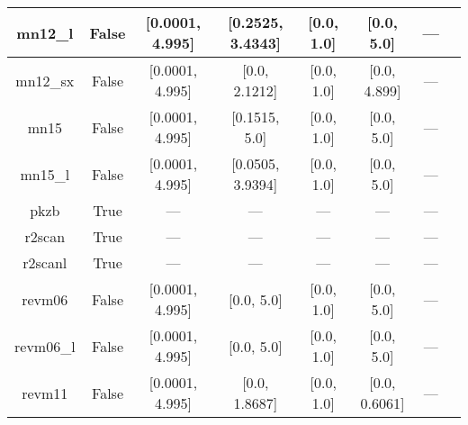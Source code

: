 \begin{tabular}{|c|c|c|c|c|c|c|l|}
      mn12\_l &                 False &  [0.0001, 4.995] & [0.2525, 3.4343] &       [0.0, 1.0] &     [0.0, 5.0] &        --- &                                                          \cite{Peverati2012_13171} \\ \hline
     mn12\_sx &                 False &  [0.0001, 4.995] &    [0.0, 2.1212] &       [0.0, 1.0] &   [0.0, 4.899] &        --- &                                                          \cite{Peverati2012_16187} \\ \hline
         mn15 &                 False &  [0.0001, 4.995] &    [0.1515, 5.0] &       [0.0, 1.0] &     [0.0, 5.0] &        --- &                                                                 \cite{Yu2016_5032} \\ \hline
      mn15\_l &                 False &  [0.0001, 4.995] & [0.0505, 3.9394] &       [0.0, 1.0] &     [0.0, 5.0] &        --- &                                                                 \cite{Yu2016_1280} \\ \hline
         pkzb &                  True &              --- &              --- &              --- &            --- &        --- &                                                             \cite{Perdew1999_2544} \\ \hline
       r2scan &                  True &              --- &              --- &              --- &            --- &        --- &                                           \cite{Furness2020_8208,Furness2020_9248} \\ \hline
      r2scanl &                  True &              --- &              --- &              --- &            --- &        --- &                          \cite{Mejia2020_121109,Furness2020_8208,Furness2020_9248} \\ \hline
       revm06 &                 False &  [0.0001, 4.995] &       [0.0, 5.0] &       [0.0, 1.0] &     [0.0, 5.0] &        --- &                                                              \cite{Wang2018_10257} \\ \hline
    revm06\_l &                 False &  [0.0001, 4.995] &       [0.0, 5.0] &       [0.0, 1.0] &     [0.0, 5.0] &        --- &                                                               \cite{Wang2017_8487} \\ \hline
       revm11 &                 False &  [0.0001, 4.995] &    [0.0, 1.8687] &       [0.0, 1.0] &  [0.0, 0.6061] &        --- &                                                              \cite{Verma2019_2966} \\ \hline

\end{tabular}
